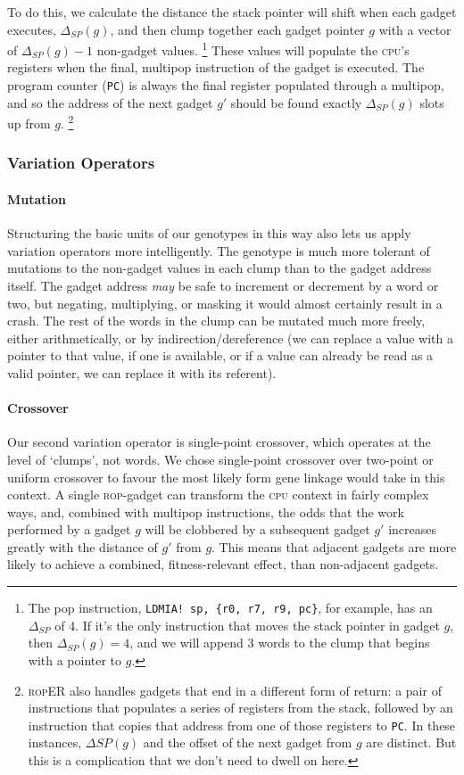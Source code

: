 To do this, we calculate the distance the stack pointer will shift
when each gadget executes, $\Delta_{SP}(g)$, and then clump
together each gadget pointer $g$ with a vector of
$\Delta_{SP}(g)-1$ non-gadget values.%
\footnote{The pop instruction, \texttt{LDMIA! sp, \{r0, r7, 
  r9, pc\}},
  for example, has an $\Delta_{SP}$ of 4. If it's the only
  instruction that moves the stack pointer in gadget $g$, then
  $\Delta_{SP}(g) = 4$, and we will append 3 words to the clump
  that begins with a pointer to $g$.}
These values will populate
the \textsc{cpu}'s registers when the final, multipop instruction of the
gadget is executed. The program counter (\texttt{PC}) is always
the final register populated through a multipop, and so the
address of the next gadget $g'$ should be found exactly
$\Delta_{SP}(g)$ slots up from $g$.%
\footnote{\textsc{rop}ER also handles gadgets that end in a different
  form of return: a pair of instructions that populates a series
  of registers from the stack, followed by an instruction that
  copies that address from one of those registers to \texttt{PC}.
  In these instances, $\Delta{SP}(g)$ and the offset of the next
  gadget from $g$ are distinct. But this is a complication that
  we don't need to dwell on here.}

\subsubsection{Variation Operators}
\paragraph{Mutation}
Structuring the basic units of our genotypes in this way also
lets us apply variation operators more intelligently. The
genotype is much more tolerant of mutations to the non-gadget
values in each clump than to the gadget address itself. The
gadget address \emph{may} be safe to increment or decrement by a
word or two, but negating, multiplying, or masking it would
almost certainly result in a crash. The rest of the words in the
clump can be mutated much more freely, either arithmetically, or
by indirection/dereference (we can replace a value with a pointer
to that value, if one is available, or if a value can already be
read as a valid pointer, we can replace it with its referent).

\paragraph{Crossover}
Our second variation operator is single-point crossover, which
operates at the level of `clumps', not words. We chose
single-point crossover over two-point or uniform crossover
to favour the most likely form gene linkage would take in this
context. A single \textsc{rop}-gadget can transform the \textsc{cpu} context in
fairly complex ways, and, combined with multipop instructions,
the odds that the work performed by a gadget $g$ will be
clobbered by a subsequent gadget $g'$ increases greatly with the
distance of $g'$ from $g$. This means that adjacent gadgets are
more likely to achieve a combined, fitness-relevant effect, than
non-adjacent gadgets. 

